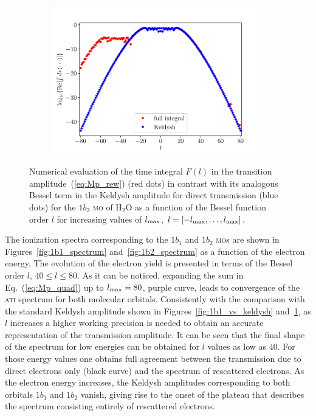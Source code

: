 \begin{figure}
\begin{subfigure}[b]{0.33\linewidth}
    \includegraphics[width=\textwidth]{figures/ch_ATI_SFA/1b2/l80n512WP50PG25MR35vsKeldysh.pdf}
  \end{subfigure}
  \caption{Numerical evaluation of the time integral $F(l)$ in the
    transition amplitude~(\ref{eq:Mp_rew}) (red dots) in contrast with
    its analogous Bessel term in the Keldysh amplitude for direct
    transmission (blue dots) for the $1b_{2}$ \textsc{mo} of H$_{2}$O
    as a function of the Bessel function order $l$ for increasing
    values of $l_{\rm{max}}$, $l=[ -l_{\rm{max}} , \dots,
      l_{\rm{max}}]$.}
    \label{fig:1b2_vs_keldysh}
\end{figure}

The ionization spectra corresponding to the $1b_{1}$ and $1b_{2}$
\textsc{mo}s are shown in Figures~\ref{fig:1b1_spectrum}
and~\ref{fig:1b2_spectrum} as a function of the electron energy. The
evolution of the electron yield is presented in terms of the Bessel
order $l$, $40 \leq l \leq 80$. As it can be noticed, expanding the
sum in Eq.~(\ref{eq:Mp_quad}) up to $l_{\rm{max}} = 80$, purple curve,
leads to convergence of the \textsc{ati} spectrum for both molecular
orbitals. Consistently with the comparison with the standard Keldysh
amplitude shown in Figures~\ref{fig:1b1_vs_keldysh}
and~\ref{fig:1b2_vs_keldysh}, as $l$ increases a higher working
precision is needed to obtain an accurate representation of the
transmission amplitude. It can be seen that the final shape of the
spectrum for low energies can be obtained for $l$ values as low as
$40$. For those energy values one obtains full agreement between the
transmission due to direct electrons only (black curve) and the
spectrum of rescattered electrons. As the electron energy increases,
the Keldysh amplitudes corresponding to both orbitals $1b_{1}$ and
$1b_{2}$ vanish, giving rise to the onset of the plateau that
describes the spectrum consisting entirely of rescattered electrons.


